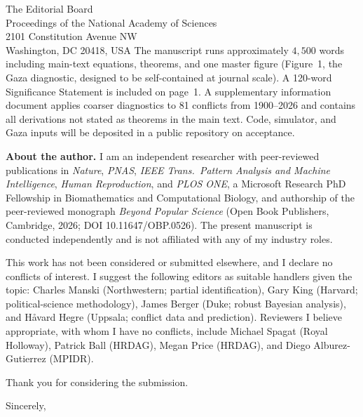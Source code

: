 \documentclass[11pt]{letter}
\begin{document}
\begin{letter}{The Editorial Board\\ Proceedings of the National Academy of Sciences\\ 2101 Constitution Avenue NW\\ Washington, DC 20418, USA}
The manuscript runs approximately $4{,}500$ words including main-text equations, theorems, and one master figure (Figure~1, the Gaza diagnostic, designed to be self-contained at journal scale). A 120-word Significance Statement is included on page~1. A supplementary information document applies coarser diagnostics to 81 conflicts from 1900--2026 and contains all derivations not stated as theorems in the main text. Code, simulator, and Gaza inputs will be deposited in a public repository on acceptance.

\textbf{About the author.} I am an independent researcher with peer-reviewed publications in \emph{Nature}, \emph{PNAS}, \emph{IEEE Trans.\ Pattern Analysis and Machine Intelligence}, \emph{Human Reproduction}, and \emph{PLOS ONE}, a Microsoft Research PhD Fellowship in Biomathematics and Computational Biology, and authorship of the peer-reviewed monograph \emph{Beyond Popular Science} (Open Book Publishers, Cambridge, 2026; DOI 10.11647/OBP.0526). The present manuscript is conducted independently and is not affiliated with any of my industry roles.

This work has not been considered or submitted elsewhere, and I declare no conflicts of interest. I suggest the following editors as suitable handlers given the topic: Charles Manski (Northwestern; partial identification), Gary King (Harvard; political-science methodology), James Berger (Duke; robust Bayesian analysis), and H{\aa}vard Hegre (Uppsala; conflict data and prediction). Reviewers I believe appropriate, with whom I have no conflicts, include Michael Spagat (Royal Holloway), Patrick Ball (HRDAG), Megan Price (HRDAG), and Diego Alburez-Gutierrez (MPIDR).

Thank you for considering the submission.

\closing{Sincerely,}

\end{letter}
\end{document}
